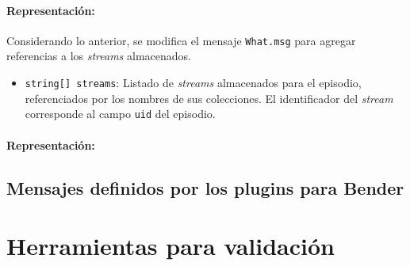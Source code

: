 \paragraph{Representación:}
Considerando lo anterior, se modifica el mensaje \texttt{What.msg} para agregar referencias a los \textit{streams} almacenados.
\begin{itemize}
	\item \texttt{string[] streams}: Listado de \textit{streams} almacenados para el episodio,  referenciados por los nombres de sus colecciones. El identificador del \textit{stream} corresponde al campo \texttt{uid} del episodio.
\end{itemize}


\paragraph{Representación:}


\lstset{style=/Style/ROS/MSG}


\subsection{Mensajes definidos por los plugins para Bender}

\lstset{style=/Style/ROS/MSG}




\section{Herramientas para validación}

